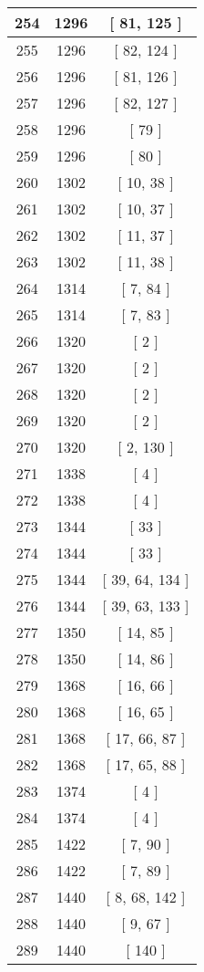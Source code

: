 \begin{center}
\begin{longtable}[H]{|| c c c ||}
254 & 1296 & [ 81, 125 ] \\ 
\hline
255 & 1296 & [ 82, 124 ] \\ 
\hline
256 & 1296 & [ 81, 126 ] \\ 
\hline
257 & 1296 & [ 82, 127 ] \\ 
\hline
258 & 1296 & [ 79 ] \\ 
\hline
259 & 1296 & [ 80 ] \\ 
\hline
260 & 1302 & [ 10, 38 ] \\ 
\hline
261 & 1302 & [ 10, 37 ] \\ 
\hline
262 & 1302 & [ 11, 37 ] \\ 
\hline
263 & 1302 & [ 11, 38 ] \\ 
\hline
264 & 1314 & [ 7, 84 ] \\ 
\hline
265 & 1314 & [ 7, 83 ] \\ 
\hline
266 & 1320 & [ 2 ] \\ 
\hline
267 & 1320 & [ 2 ] \\ 
\hline
268 & 1320 & [ 2 ] \\ 
\hline
269 & 1320 & [ 2 ] \\ 
\hline
270 & 1320 & [ 2, 130 ] \\ 
\hline
271 & 1338 & [ 4 ] \\ 
\hline
272 & 1338 & [ 4 ] \\ 
\hline
273 & 1344 & [ 33 ] \\ 
\hline
274 & 1344 & [ 33 ] \\ 
\hline
275 & 1344 & [ 39, 64, 134 ] \\ 
\hline
276 & 1344 & [ 39, 63, 133 ] \\ 
\hline
277 & 1350 & [ 14, 85 ] \\ 
\hline
278 & 1350 & [ 14, 86 ] \\ 
\hline
279 & 1368 & [ 16, 66 ] \\ 
\hline
280 & 1368 & [ 16, 65 ] \\ 
\hline
281 & 1368 & [ 17, 66, 87 ] \\ 
\hline
282 & 1368 & [ 17, 65, 88 ] \\ 
\hline
283 & 1374 & [ 4 ] \\ 
\hline
284 & 1374 & [ 4 ] \\ 
\hline
285 & 1422 & [ 7, 90 ] \\ 
\hline
286 & 1422 & [ 7, 89 ] \\ 
\hline
287 & 1440 & [ 8, 68, 142 ] \\ 
\hline
288 & 1440 & [ 9, 67 ] \\ 
\hline
289 & 1440 & [ 140 ] \\ 

\end{longtable}
\end{center}
